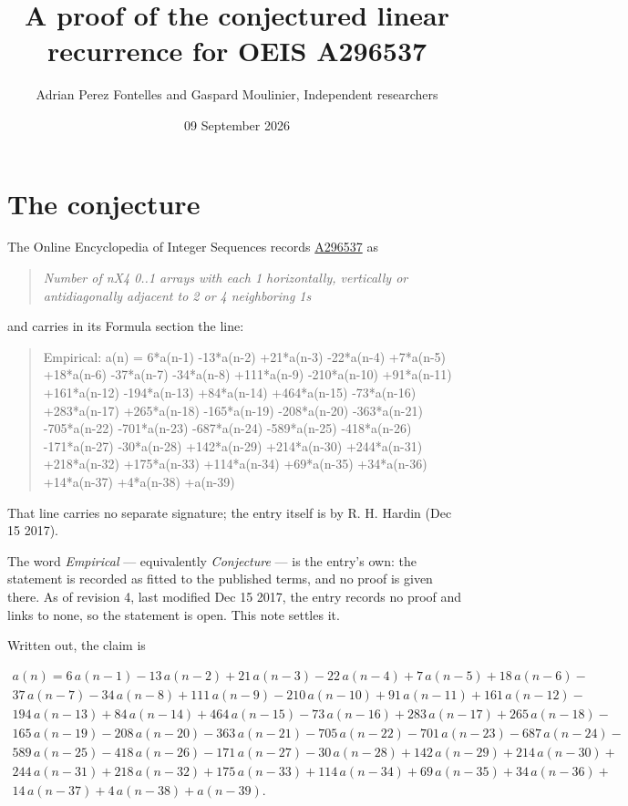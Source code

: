 \documentclass[11pt]{article}
\title{A proof of the conjectured linear recurrence for OEIS A296537}
\author{Adrian Perez Fontelles and Gaspard Moulinier, Independent researchers}
\date{09 September 2026}
\theoremstyle{definition}
\begin{document}
\maketitle
\section{The conjecture}

The Online Encyclopedia of Integer Sequences records \href{https://oeis.org/A296537}{A296537} as

\begin{quote}\itshape Number of nX4 0..1 arrays with each 1 horizontally, vertically or antidiagonally adjacent to 2 or 4 neighboring 1s\end{quote}

and carries in its Formula section the line:

\begin{quote}\ttfamily Empirical: a(n) = 6*a(n-1) -13*a(n-2) +21*a(n-3) -22*a(n-4) +7*a(n-5) +18*a(n-6) -37*a(n-7) -34*a(n-8) +111*a(n-9) -210*a(n-10) +91*a(n-11) +161*a(n-12) -194*a(n-13) +84*a(n-14) +464*a(n-15) -73*a(n-16) +283*a(n-17) +265*a(n-18) -165*a(n-19) -208*a(n-20) -363*a(n-21) -705*a(n-22) -701*a(n-23) -687*a(n-24) -589*a(n-25) -418*a(n-26) -171*a(n-27) -30*a(n-28) +142*a(n-29) +214*a(n-30) +244*a(n-31) +218*a(n-32) +175*a(n-33) +114*a(n-34) +69*a(n-35) +34*a(n-36) +14*a(n-37) +4*a(n-38) +a(n-39)\end{quote}

That line carries no separate signature; the entry itself is by R. H. Hardin (Dec 15 2017).

The word {\itshape Empirical} --- equivalently {\itshape Conjecture} --- is the entry's own: the statement is recorded as fitted to the published terms, and no proof is given there. As of revision 4, last modified Dec 15 2017, the entry records no proof and links to none, so the statement is open. This note settles it.

Written out, the claim is

\begin{multline*} a(n) = 6\,a(n-1) - 13\,a(n-2) + 21\,a(n-3) - 22\,a(n-4) + 7\,a(n-5) + 18\,a(n-6) - \\ 37\,a(n-7) - 34\,a(n-8) + 111\,a(n-9) - 210\,a(n-10) + 91\,a(n-11) + 161\,a(n-12) - \\ 194\,a(n-13) + 84\,a(n-14) + 464\,a(n-15) - 73\,a(n-16) + 283\,a(n-17) + 265\,a(n-18) - \\ 165\,a(n-19) - 208\,a(n-20) - 363\,a(n-21) - 705\,a(n-22) - 701\,a(n-23) - 687\,a(n-24) - \\ 589\,a(n-25) - 418\,a(n-26) - 171\,a(n-27) - 30\,a(n-28) + 142\,a(n-29) + 214\,a(n-30) + \\ 244\,a(n-31) + 218\,a(n-32) + 175\,a(n-33) + 114\,a(n-34) + 69\,a(n-35) + 34\,a(n-36) + \\ 14\,a(n-37) + 4\,a(n-38) + a(n-39). \end{multline*}
\end{document}
